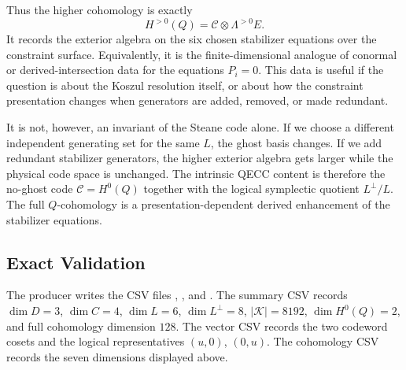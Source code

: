 Thus the higher cohomology is exactly
\[
  H^{>0}(Q)=\mathcal C\otimes\Lambda^{>0}E.
\]
It records the exterior algebra on the six chosen stabilizer equations over the
constraint surface. Equivalently, it is the finite-dimensional analogue of
conormal or derived-intersection data for the equations \(P_i=0\). This data is
useful if the question is about the Koszul resolution itself, or about how the
constraint presentation changes when generators are added, removed, or made
redundant.

It is not, however, an invariant of the Steane code alone. If we choose a
different independent generating set for the same \(L\), the ghost basis
changes. If we add redundant stabilizer generators, the higher exterior algebra
gets larger while the physical code space is unchanged. The intrinsic QECC
content is therefore the no-ghost code \(\mathcal C=H^0(Q)\) together with the
logical symplectic quotient \(L^\perp/L\). The full \(Q\)-cohomology is a
presentation-dependent derived enhancement of the stabilizer equations.

\subsection{Exact Validation}

The producer 
writes the CSV files
,
,
and
.
The summary CSV records \(\dim D=3\), \(\dim C=4\), \(\dim L=6\),
\(\dim L^\perp=8\), \(|\mathcal K|=8192\), \(\dim H^0(Q)=2\), and full
cohomology dimension \(128\). The vector CSV records the two codeword cosets
and the logical representatives \((u,0)\), \((0,u)\). The cohomology CSV records
the seven dimensions displayed above.
